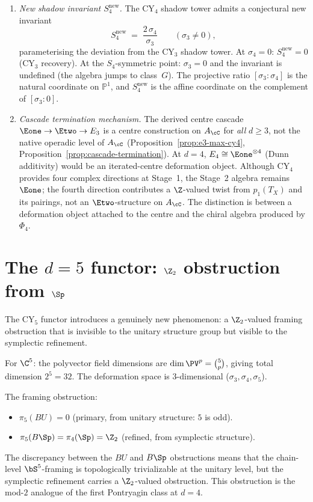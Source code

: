\begin{conjecture}[The \texorpdfstring{$d = 4$}{d = 4} \texorpdfstring{$\En$}{E-n} stabilisation: \texorpdfstring{$p_1$}{p-1}-twisted algebras and shadow tower]
\begin{enumerate}[label=\textup{(\roman*)}]
 \item \emph{New shadow invariant $S_4^{\mathrm{new}}$.} The CY$_4$ shadow tower admits a conjectural new invariant
 \[
 S_4^{\mathrm{new}} \;=\; \frac{2\,\sigma_4}{\sigma_3} \qquad (\sigma_3 \neq 0),
 \]
 parameterising the deviation from the CY$_3$ shadow tower. At $\sigma_4 = 0$: $S_4^{\mathrm{new}} = 0$ (CY$_3$ recovery). At the $S_4$-symmetric point: $\sigma_3 = 0$ and the invariant is undefined (the algebra jumps to class~$G$). The projective ratio $[\sigma_3 : \sigma_4]$ is the natural coordinate on $\mathbb{P}^1$, and $S_4^{\mathrm{new}}$ is the affine coordinate on the complement of $[\sigma_3 : 0]$.

 \item \emph{Cascade termination mechanism.} The derived centre cascade $\Eone \to \Etwo \to E_3$ is a centre construction on \(A_\cC\) for \emph{all} \(d\geq3\), not the native operadic level of \(A_\cC\) (Proposition~\ref{prop:e3-max-cy4}, Proposition~\ref{prop:cascade-termination}). At $d = 4$, $E_4 \cong \Eone^{\otimes 4}$ (Dunn additivity) would be an iterated-centre deformation object. Although CY$_4$ provides four complex directions at Stage~1, the Stage~2 algebra remains \(\Eone\); the fourth direction contributes a \(\Z\)-valued twist from \(p_1(T_X)\) and its pairings, not an \(\Etwo\)-structure on \(A_\cC\). The distinction is between a deformation object attached to the centre and the chiral algebra produced by \(\Phi_4\).
\end{enumerate}
\end{conjecture}


\section{The \texorpdfstring{$d = 5$}{d = 5} functor: \texorpdfstring{$\Z_2$}{Z-2} obstruction from \texorpdfstring{$\Sp$}{Sp}}
\label{sec:d5-functor}

The CY$_5$ functor introduces a genuinely new phenomenon: a $\Z_2$-valued framing obstruction that is invisible to the unitary structure group but visible to the symplectic refinement.

For $\C^5$: the polyvector field dimensions are $\dim \PV^p = \binom{5}{p}$, giving total dimension $2^5 = 32$. The deformation space is $3$-dimensional ($\sigma_3, \sigma_4, \sigma_5$).

The framing obstruction:
\begin{itemize}
 \item $\pi_5(BU) = 0$ (primary, from unitary structure: $5$ is odd).
 \item $\pi_5(B\Sp) = \pi_4(\Sp) = \Z_2$ (refined, from symplectic structure).
\end{itemize}
The discrepancy between the $BU$ and $B\Sp$ obstructions means that the chain-level $\bS^5$-framing is topologically trivializable at the unitary level, but the symplectic refinement carries a $\Z_2$-valued obstruction. This obstruction is the mod-$2$ analogue of the first Pontryagin class at $d = 4$.


